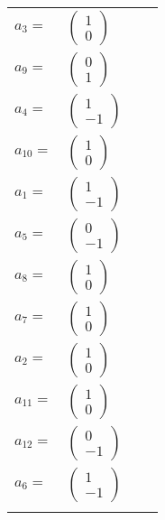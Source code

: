 \documentclass[1p]{elsarticle_modified}
\theoremstyle{definition}
\begin{document}
\begin{tabular}{m{7pt} m{180pt} m{7pt} m{180pt} }
\flushright $a_{3}=$&$\begin{pmatrix}1\\0\end{pmatrix}$ \\
\flushright $a_{9}=$&$\begin{pmatrix}0\\1\end{pmatrix}$ \\
\flushright $a_{4}=$&$\begin{pmatrix}1\\-1\end{pmatrix}$ \\
\flushright $a_{10}=$&$\begin{pmatrix}1\\0\end{pmatrix}$ \\
\flushright $a_{1}=$&$\begin{pmatrix}1\\-1\end{pmatrix}$ \\
\flushright $a_{5}=$&$\begin{pmatrix}0\\-1\end{pmatrix}$ \\
\flushright $a_{8}=$&$\begin{pmatrix}1\\0\end{pmatrix}$ \\
\flushright $a_{7}=$&$\begin{pmatrix}1\\0\end{pmatrix}$ \\
\flushright $a_{2}=$&$\begin{pmatrix}1\\0\end{pmatrix}$ \\
\flushright $a_{11}=$&$\begin{pmatrix}1\\0\end{pmatrix}$ \\
\flushright $a_{12}=$&$\begin{pmatrix}0\\-1\end{pmatrix}$ \\
\flushright $a_{6}=$&$\begin{pmatrix}1\\-1\end{pmatrix}$\\&\end{tabular}
\end{document}
